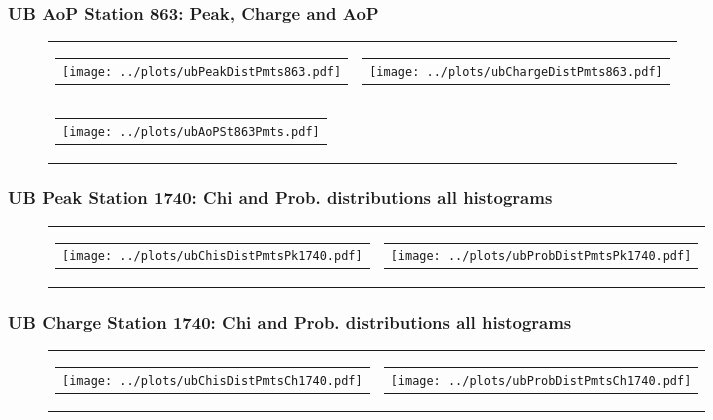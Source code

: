 \documentclass[aspectratio=169]{beamer}
\begin{document}

\begin{frame}
  \frametitle{UB AoP Station 863: Peak, Charge and AoP}
  \begin{figure}
    \centering
    \begin{tabularx}{\textwidth}{CC}
      \begin{tabular}{l}
        \texttt{[image: ../plots/ubPeakDistPmts863.pdf]}
      \end{tabular}
      &
      \begin{tabular}{l}
        \texttt{[image: ../plots/ubChargeDistPmts863.pdf]}
      \end{tabular}
      \\
      \begin{tabular}{l}
        \texttt{[image: ../plots/ubAoPSt863Pmts.pdf]}
      \end{tabular}
    \end{tabularx}
  \end{figure}
\end{frame}


\begin{frame}
  \frametitle{UB Peak Station 1740: Chi and Prob. distributions all histograms}
  \begin{figure}
    \centering
    \begin{tabularx}{\textwidth}{CC}
      \begin{tabular}{l}
        \texttt{[image: ../plots/ubChisDistPmtsPk1740.pdf]}
      \end{tabular}
      &
      \begin{tabular}{l}
        \texttt{[image: ../plots/ubProbDistPmtsPk1740.pdf]}
      \end{tabular}
    \end{tabularx}
  \end{figure}
\end{frame}


\begin{frame}
  \frametitle{UB Charge Station 1740: Chi and Prob. distributions all histograms}
  \begin{figure}
    \centering
    \begin{tabularx}{\textwidth}{CC}
      \begin{tabular}{l}
        \texttt{[image: ../plots/ubChisDistPmtsCh1740.pdf]}
      \end{tabular}
      &
      \begin{tabular}{l}
        \texttt{[image: ../plots/ubProbDistPmtsCh1740.pdf]}
      \end{tabular}
    \end{tabularx}
  \end{figure}
\end{frame}
\end{document}

